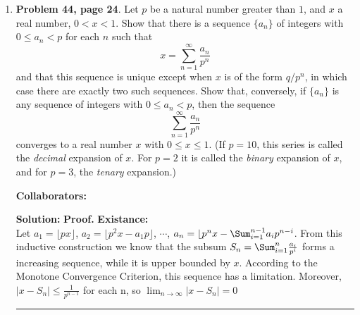\documentclass{article}%
\newenvironment{proof}[1][Proof]{\textbf{#1.} }{\ \rule{0.5em}{0.5em}}
\begin{document}
\begin{enumerate}
\begin{proof}
For the general case, it is the same using the similar skills.\\ 
\textbf{Nested Set theorem $\to$ Completeness Axiom theorem:}\\
Let $E$ be a nonempty and upper-bounded set of real numbers, and let $T$ is the set consists of all upper bounders of $E$. Pick $a_1\notin T$, and $b_1 \notin T$, then $a_1 < b_1$.
If $\frac{a_1+b_1}{2} \in T$, then $[a_2, b_2] = \left[a_1, \frac{a_1+b_1}{2}\right]$; else $[a_2, b_2] = \left[\frac{a_1+b_1}{2}, b_1\right]$. 
Construct $[a_3, b_3], \cdots$ as above, we can get a nested set series $\{[a_n, b_n]\}$, satisfying $a_n\notin T, b_n\in T$. With Nested Set theorem, there exist a real number $x$ belongs to all these closed sets, and $\lim_{n\to\infty}a_n = \lim_{n\to\infty}b_n = x$.\\
If $x\notin T$, then exists $y\in E$, s.t. $x < y$. So $b_n < x$ when $n$ is large enough. This makes a contradiction with $b_n\in T$, so $x\in T$. On the othe hand, if there exists $z\in T$, s.t. $z < x$, then $a_n > z$ when n is large enough. This makes a contradiction with $a_n\in E$. So $x$ is the supremum of $E$.
\end{proof}

\bigskip

\item \textbf{Problem 44, page 24}.  Let $p$ be a natural number greater than $1$, and $x$ a real number, $0<x<1$.  Show that there is a sequence $\{a_n\}$ of integers with $0\leq a_n < p$ for each $n$ such that \[
x = \sum_{n=1}^{\infty} \frac{a_n}{p^n} \]and that this sequence is unique except when $x$ is of the form $q/p^n$, in which case there are exactly two such sequences.  Show that, conversely, if $\{a_n\}$ is any sequence of integers with $0\leq a_n < p$, then the sequence \[\sum_{n=1}^{\infty} \frac{a_n}{p^n} \]converges to a real number $x$ with $0\leq x \leq 1$. (If $p = 10$, this series is called the \emph{decimal} expansion of $x$.  For $p = 2$ it is called the \emph{binary} expansion of $x$, and for $p = 3$, the \emph{tenary} expansion.) 


\bigskip
\textbf{Collaborators:}\\
\smallskip
 
\textbf{Solution:}
\begin{proof}
\textbf{Existance:} \\
Let $a_1 = \lfloor px\rfloor$, $a_2 = \lfloor p^2x-a_1p\rfloor$, $\cdots$, $a_n = \lfloor p^nx - \Sum_{i=1}^{n-1}a_ip^{n-i}$. From this inductive construction we know that the subsum $S_n = \Sum_{i=1}^n\frac{a_i}{p^i}$ forms a increasing sequence, while it is upper bounded by $x$. According to the Monotone Convergence Criterion, this sequence has a limitation. Moreover, $|x - S_n| \le \frac{1}{p^{n-1}}$ for each n, so $\lim_{n\to\infty} |x-S_n|= 0$
\end{proof}
\bigskip




\end{enumerate}
\end{document}
